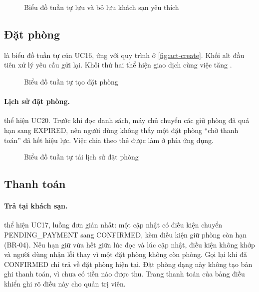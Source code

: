 \begin{figure}[H]
\centering
{}
\caption{Biểu đồ tuần tự lưu và bỏ lưu khách sạn yêu thích}\label{fig:seq-favorites}
\end{figure}

\subsection{Đặt phòng}

 là biểu đồ tuần tự của UC16, ứng với quy trình ở \cref{fig:act-create}. Khối alt đầu tiên xử lý yêu cầu gửi lại. Khối thứ hai thể hiện giao dịch cùng việc tăng .

\begin{figure}[H]
\centering
{}
\caption{Biểu đồ tuần tự tạo đặt phòng}\label{fig:seq-booking}
\end{figure}


\paragraph{Lịch sử đặt phòng.}  thể hiện UC20. Trước khi đọc danh sách, máy chủ chuyển các giữ phòng đã quá hạn sang EXPIRED, nên người dùng không thấy một đặt phòng ``chờ thanh toán'' đã hết hiệu lực. Việc chia theo thẻ được làm ở phía ứng dụng.

\begin{figure}[H]
\centering
{}
\caption{Biểu đồ tuần tự tải lịch sử đặt phòng}\label{fig:seq-history}
\end{figure}

\subsection{Thanh toán}\label{sec:payment-design}

\paragraph{Trả tại khách sạn.}  thể hiện UC17, luồng đơn giản nhất: một cập nhật có điều kiện chuyển PENDING\_PAYMENT sang CONFIRMED, kèm điều kiện giữ phòng còn hạn (BR-04). Nếu hạn giữ vừa hết giữa lúc đọc và lúc cập nhật, điều kiện không khớp và người dùng nhận lỗi thay vì một đặt phòng không còn phòng. Gọi lại khi đã CONFIRMED chỉ trả về đặt phòng hiện tại. Đặt phòng dạng này không tạo bản ghi thanh toán, vì chưa có tiền nào được thu. Trang thanh toán của bảng điều khiển ghi rõ điều này cho quản trị viên.

